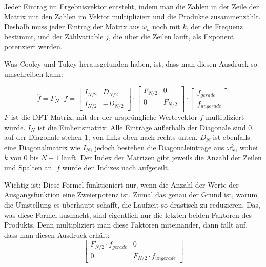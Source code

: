 \documentclass[a4paper,12pt]{article}
\theoremstyle{definition}
\theoremstyle{remark}
\begin{document}
Jeder Eintrag im Ergebnisvektor entsteht, indem man die Zahlen in der Zeile der Matrix 
mit den Zahlen im Vektor multipliziert und die Produkte zusammenzählt. Deshalb muss 
jeder Eintrag der Matrix aus $\omega_n$ noch mit $k$, der die Frequenz bestimmt, und 
der Zählvariable $j$, die über die Zeilen läuft, als Exponent potenziert werden.

Was Cooley und Tukey herausgefunden haben, ist, dass man diesen Ausdruck so umschreiben 
kann:

\[\hat{f} = F_N \cdot f = 
\begin{bmatrix}
I_{N/2} & D_{N/2} \\
I_{N/2} & -D_{N/2}
\end{bmatrix}
\cdot 
\begin{bmatrix}
  F_{N/2} & 0 \\
  0 & F_{N/2} \\ 
\end{bmatrix}
\cdot 
\begin{bmatrix}
  f_{gerade} \\
  f_{ungerade}
  \end{bmatrix}
  \]
$F$ ist die DFT-Matrix, mit der der ursprüngliche Wertevektor $f$ multipliziert wurde. 
$I_N$ ist die Einheitsmatrix: Alle Einträge außerhalb der Diagonale sind $0$, auf der 
Diagonale stehen $1$, von links oben nach rechts unten. $D_N$ ist ebenfalls eine Diagonalmatrix 
wie $I_N$, jedoch bestehen die Diagonaleinträge aus $\omega_N^k$, wobei $k$ von $0$ bis $N-1$ 
läuft. Der Index der Matrizen gibt jeweils die Anzahl der Zeilen und Spalten an. $f$ wurde den Indizes nach aufgeteilt. 

Wichtig ist: Diese Formel funktioniert nur, wenn die Anzahl der Werte der Ausgangsfunktion 
eine Zweierpotenz ist. Zumal das genau der Grund ist, warum die Umstellung es überhaupt schafft, die Laufzeit 
so drastisch zu reduzieren. Das, was diese Formel ausmacht, sind eigentlich nur die letzten beiden 
Faktoren des Produkts. Denn multipliziert man diese Faktoren miteinander, dann fällt auf, dass 
man diesen Ausdruck erhält:
\[
\begin{bmatrix}
F_{N/2} \cdot f_{gerade} & 0 \\
0 & F_{N/2} \cdot f_{ungerade} 
\end{bmatrix}
\]
\end{document}
